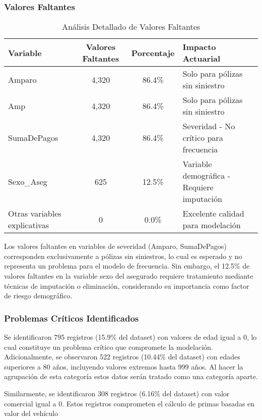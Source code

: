 \subsubsection{Valores Faltantes}

\begin{table}[H]
\centering
\caption{Análisis Detallado de Valores Faltantes}
\begin{tabular}{|l|c|c|l|}
\hline
\textbf{Variable} & \textbf{Valores Faltantes} & \textbf{Porcentaje} & \textbf{Impacto Actuarial} \\
\hline
Amparo & 4,320 & 86.4\% & Solo para pólizas sin siniestro \\
Amp & 4,320 & 86.4\% & Solo para pólizas sin siniestro \\
SumaDePagos & 4,320 & 86.4\% & Severidad - No crítico para frecuencia \\
Sexo\_Aseg & 625 & 12.5\% & Variable demográfica - Requiere imputación \\
Otras variables explicativas & 0 & 0.0\% & Excelente calidad para modelación \\
\hline
\end{tabular}
\end{table}

Los valores faltantes en variables de severidad (Amparo, SumaDePagos) corresponden exclusivamente a pólizas sin siniestros, lo cual es esperado y no representa un problema para el modelo de frecuencia. Sin embargo, el 12.5\% de valores faltantes en la variable sexo del asegurado requiere tratamiento mediante técnicas de imputación o eliminación, considerando su importancia como factor de riesgo demográfico.

\subsubsection{Problemas Críticos Identificados}

Se identificaron 795 registros (15.9\% del dataset) con valores de edad igual a 0, lo cual constituye un problema crítico que compromete la modelación.
Adicionalmente, se observaron 522 registros (10.44\% del dataset) con edades superiores a 80 años, incluyendo valores extremos hasta 999 años. Al hacer la agrupación de esta categoría estos datos serán tratado como una categoría aparte.
\newline


Similarmente, se identificaron 308 registros (6.16\% del dataset) con valor comercial igual a 0. Estos registros comprometen el cálculo de primas basadas en valor del vehículo
\newline

